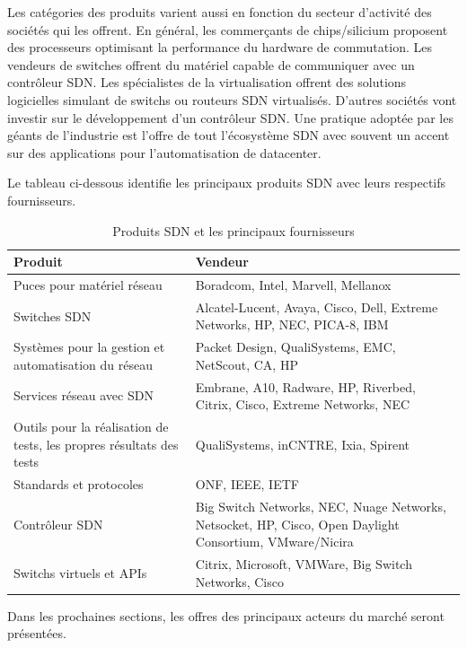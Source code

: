 Les catégories des produits varient aussi en fonction du secteur d'activité des sociétés qui les offrent. En général, les commerçants de chips/silicium proposent des processeurs optimisant la performance du hardware de commutation.  Les vendeurs de switches offrent du matériel capable de communiquer avec un contrôleur SDN. Les spécialistes de la \gls{virtualisation} offrent des solutions logicielles simulant de switchs ou routeurs SDN virtualisés. D'autres sociétés vont investir sur le développement d'un contrôleur SDN. Une pratique adoptée par les géants de l'industrie est l'offre de tout l'écosystème SDN avec souvent un accent sur des applications pour l'automatisation de \gls{datacenter}.\cite{2013GuideSDNNVEcosystem} 
 
 
Le tableau ci-dessous identifie les principaux produits SDN avec leurs respectifs fournisseurs.

\begin{table}[!h]
\centering
\begin{tabular}{|p{6cm}|p{9cm}|}
\hline 
\bf Produit & \bf Vendeur \\ 
\hline 
Puces pour matériel réseau & Boradcom, Intel, Marvell, Mellanox \\ 
\hline 
Switches SDN & Alcatel-Lucent, Avaya, Cisco, Dell, Extreme Networks, HP, NEC, PICA-8, IBM \\ 
\hline 
Systèmes pour la gestion et automatisation du réseau & Packet Design, QualiSystems, EMC, NetScout, CA, HP \\ 
\hline 
Services réseau avec SDN & Embrane, A10, Radware, HP, Riverbed, Citrix, Cisco,  Extreme Networks, NEC \\ 
\hline 
Outils pour la réalisation de tests, les propres résultats des tests & QualiSystems, inCNTRE, Ixia, Spirent \\ 
\hline 
Standards et protocoles & ONF, IEEE, IETF \\ 
\hline 
Contrôleur SDN & Big Switch Networks, NEC, Nuage Networks, Netsocket, HP, Cisco, Open Daylight Consortium, VMware/Nicira \\ 
\hline 
Switchs virtuels et APIs & Citrix, Microsoft, VMWare, Big Switch Networks, Cisco \\ 
\hline 
\end{tabular} 
\caption{Produits SDN et les principaux fournisseurs \cite{2013GuideSDNNVEcosystem}}
\end{table} 
 
Dans les prochaines sections, les offres des principaux acteurs du marché seront présentées.

